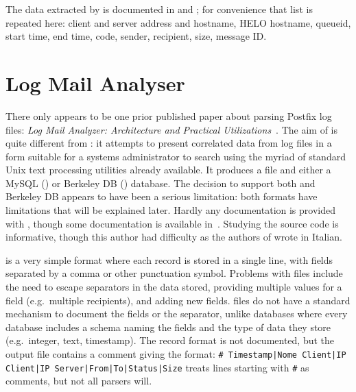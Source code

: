 The data extracted by \parsername{} is documented in
 and ; for
convenience that list is repeated here: client and server 
address and hostname, HELO hostname, queueid, start time, end time,
 code, sender, recipient, size, message ID\@.

\section{Log Mail Analyser}

\label{prior art}

There only appears to be one prior published paper about parsing Postfix
log files: \textit{Log Mail Analyzer: Architecture and Practical
Utilizations\/}~\cite{log-mail-analyser}.  The aim of  is
quite different from \parsername{}: it attempts to present correlated data
from log files in a form suitable for a systems administrator to search
using the myriad of standard Unix text processing utilities already
available.  It produces a  file and either a MySQL
() or Berkeley DB
()
database.  The decision to support both  and Berkeley DB
appears to have been a serious limitation: both formats have limitations
that will be explained later.  Hardly any documentation is provided with
, though some documentation is available
in~\cite{log-mail-analyser}.  Studying the source code is informative,
though this author had difficulty as the authors of  wrote in
Italian.

 is a very simple format where each record is stored in a
single line, with fields separated by a comma or other punctuation symbol.
Problems with  files include the need to escape separators in
the data stored, providing multiple values for a field (e.g.\ multiple
recipients), and adding new fields.   files do not have a
standard mechanism to document the fields or the separator, unlike
 databases where every database includes a schema naming the
fields and the type of data they store (e.g.\ integer, text, timestamp).
The  record format is not documented, but the output file
contains a comment giving the format:\newline{} \texttt{\# Timestamp|Nome
Client|IP Client|IP Server|From|To|Status|Size} \newline{}
treats  lines starting with \texttt{\#} as comments, but not
all  parsers will.

